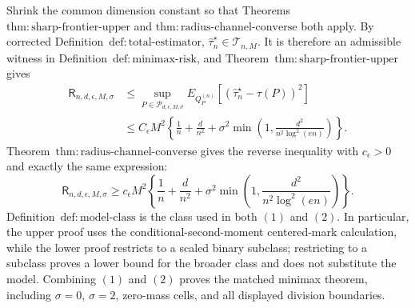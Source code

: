 Shrink the common dimension constant so that Theorems~\(\mathrm{thm:sharp\text{-}frontier\text{-}upper}\) and \(\mathrm{thm:radius\text{-}channel\text{-}converse}\) both apply.  By corrected Definition~\(\mathrm{def:total\text{-}estimator}\), \(\widehat\tau_n^{\star}\in\mathcal T_{n,M}\).  It is therefore an admissible witness in Definition~\(\mathrm{def:minimax\text{-}risk}\), and Theorem~\(\mathrm{thm:sharp\text{-}frontier\text{-}upper}\) gives
\[
\begin{aligned}
 \mathsf R_{n,d,\epsilon,M,\sigma}
 &\le\sup_{P\in\mathcal P_{d,\epsilon,M,\sigma}}
 E_{Q_P^{(n)}}[(\widehat\tau_n^{\star}-\tau(P))^2]\\
 &\le C_{\epsilon}M^2\left\{
 \frac1n+\frac d{n^2}
 +\sigma^2\min\left(1,\frac{d^2}{n^2\log^2(en)}\right)
 \right\}.
\end{aligned}
\tag{1}
\]
Theorem~\(\mathrm{thm:radius\text{-}channel\text{-}converse}\) gives the reverse inequality with \(c_{\epsilon}>0\) and exactly the same expression:
\[
 \mathsf R_{n,d,\epsilon,M,\sigma}
 \ge c_{\epsilon}M^2\left\{
 \frac1n+\frac d{n^2}
 +\sigma^2\min\left(1,\frac{d^2}{n^2\log^2(en)}\right)
 \right\}.
\tag{2}
\]
Definition~\(\mathrm{def:model\text{-}class}\) is the class used in both \((1)\) and \((2)\).  In particular, the upper proof uses the conditional-second-moment centered-mark calculation, while the lower proof restricts to a scaled binary subclass; restricting to a subclass proves a lower bound for the broader class and does not substitute the model.  Combining \((1)\) and \((2)\) proves the matched minimax theorem, including \(\sigma=0\), \(\sigma=2\), zero-mass cells, and all displayed division boundaries.